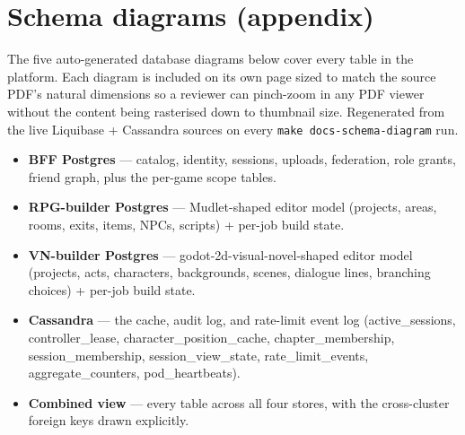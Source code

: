 \chapter{Schema diagrams (appendix)}\label{ch:schema-diagrams}

The five auto-generated database diagrams below cover every table in
the platform. Each diagram is included on its own page sized to match
the source PDF's natural dimensions so a reviewer can pinch-zoom in
any PDF viewer without the content being rasterised down to thumbnail
size. Regenerated from the live Liquibase + Cassandra sources on every
\texttt{make docs-schema-diagram} run.

\begin{itemize}
  \item \textbf{BFF Postgres} --- catalog, identity, sessions, uploads,
        federation, role grants, friend graph, plus the per-game
        scope tables.
  \item \textbf{RPG-builder Postgres} --- Mudlet-shaped editor model
        (projects, areas, rooms, exits, items, NPCs, scripts) +
        per-job build state.
  \item \textbf{VN-builder Postgres} --- godot-2d-visual-novel-shaped
        editor model (projects, acts, characters, backgrounds,
        scenes, dialogue lines, branching choices) + per-job build
        state.
  \item \textbf{Cassandra} --- the cache, audit log, and rate-limit
        event log (active\_sessions, controller\_lease,
        character\_position\_cache, chapter\_membership,
        session\_membership, session\_view\_state, rate\_limit\_events,
        aggregate\_counters, pod\_heartbeats).
  \item \textbf{Combined view} --- every table across all four stores,
        with the cross-cluster foreign keys drawn explicitly.
\end{itemize}


